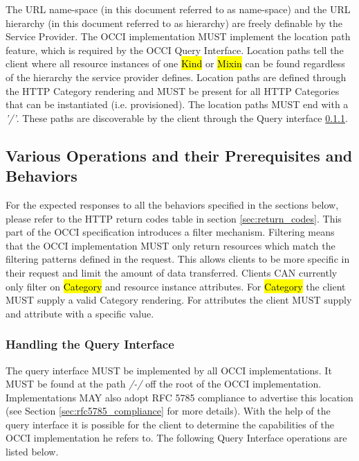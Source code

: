 \documentclass[10pt,a4paper]{article}
\begin{document}
The URL name-space (in this document referred to as name-space) and
the URL hierarchy (in this document referred to as hierarchy) are freely
definable by the Service Provider. The OCCI implementation MUST
implement the location path feature, which is required by the OCCI
Query Interface. Location paths tell the client where all resource
instances of one \hl{Kind} or \hl{Mixin} can be found regardless of
the hierarchy the service provider defines. Location paths are defined
through the HTTP Category rendering and MUST be present for all HTTP
Categories that can be instantiated (i.e. provisioned). The location
paths MUST end with a \emph{'/'}. These paths are discoverable by the
client through the Query interface \ref{sec:query}.

\subsection{Various Operations and their Prerequisites and Behaviors}
\label{sec:behaviours}
For the expected responses to all the behaviors specified in the
sections below, please refer to the HTTP return codes table in section
\ref{sec:return_codes}. This part of the OCCI specification introduces
a filter mechanism. Filtering means that the OCCI implementation MUST
only return resources which match the filtering patterns defined in
the request. This allows clients to be more specific in their request
and limit the amount of data transferred. Clients CAN currently only
filter on \hl{Category} and resource instance attributes. For
\hl{Category} the client MUST supply a valid Category rendering. For
attributes the client MUST supply and attribute with a specific value.

\subsubsection{Handling the Query Interface}
\label{sec:query}
The query interface MUST be implemented by all OCCI
implementations. It MUST be found at the path \emph{/-/} off the root
of the OCCI implementation. Implementations MAY also adopt RFC 5785
\cite{rfc5785} compliance to advertise this location (see Section
\ref{sec:rfc5785_compliance} for more details).  With the help of the
query interface it is possible for the client to determine the
capabilities of the OCCI implementation he refers to. The following
Query Interface operations are listed below.
\end{document}
